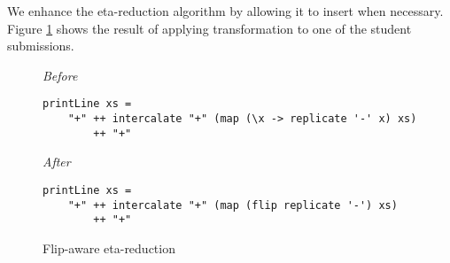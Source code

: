 We enhance the eta-reduction algorithm by allowing it to insert  when necessary. Figure \ref{fig:misc-eta-flip} shows the result of applying transformation to one of the student submissions.

\begin{figure}
\centering
\emph{Before}
\begin{verbatim}
printLine xs =
    "+" ++ intercalate "+" (map (\x -> replicate '-' x) xs)
        ++ "+"
\end{verbatim}
\smallskip
\emph{After}
\begin{verbatim}
printLine xs =
    "+" ++ intercalate "+" (map (flip replicate '-') xs)
        ++ "+"
\end{verbatim}
\caption{Flip-aware eta-reduction}
\label{fig:misc-eta-flip}
\end{figure}
